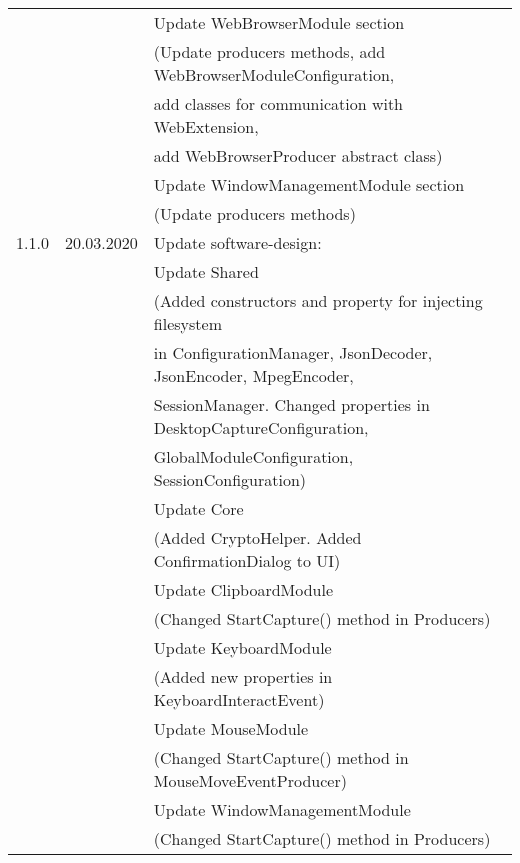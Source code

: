 \begin{table}[h]
\begin{tabular}{lll}
&& Update WebBrowserModule section\\
&& (Update producers methods, add WebBrowserModuleConfiguration,\\
&& add classes for communication with WebExtension,\\
&& add WebBrowserProducer abstract class)\\
&& Update WindowManagementModule section\\
&& (Update producers methods)\\
\hline
1.1.0			  & 20.03.2020	  & Update software-design:\\
&& Update Shared\\
&& (Added constructors and property for injecting filesystem\\
&& in ConfigurationManager, JsonDecoder, JsonEncoder, MpegEncoder, \\ 
&& SessionManager. Changed properties in DesktopCaptureConfiguration,\\
&& GlobalModuleConfiguration, SessionConfiguration)\\
&& Update Core\\
&& (Added CryptoHelper. Added ConfirmationDialog to UI)\\
&& Update ClipboardModule\\
&& (Changed StartCapture() method in Producers)\\
&& Update KeyboardModule\\
&& (Added new properties in KeyboardInteractEvent)\\
&& Update MouseModule\\
&& (Changed StartCapture() method in MouseMoveEventProducer)\\
&& Update WindowManagementModule\\
&& (Changed StartCapture() method in Producers)\\


\end{tabular}
\end{table}